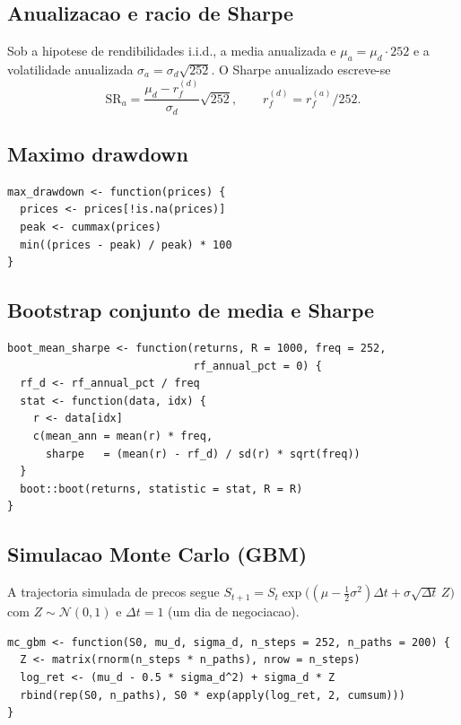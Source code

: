 \documentclass[11pt,a4paper]{article}
\begin{document}
\subsection{Anualizacao e racio de Sharpe}

Sob a hipotese de rendibilidades i.i.d., a media anualizada e
$\mu_a = \mu_d \cdot 252$ e a volatilidade anualizada
$\sigma_a = \sigma_d \sqrt{252}$. O Sharpe anualizado escreve-se
\[
  \mathrm{SR}_a = \frac{\mu_d - r_f^{(d)}}{\sigma_d}\sqrt{252},
  \qquad r_f^{(d)} = r_f^{(a)}/252.
\]

\subsection{Maximo drawdown}
\begin{lstlisting}[caption={Maximo drawdown a partir de uma serie de precos.}]
max_drawdown <- function(prices) {
  prices <- prices[!is.na(prices)]
  peak <- cummax(prices)
  min((prices - peak) / peak) * 100
}
\end{lstlisting}

\subsection{Bootstrap conjunto de media e Sharpe}
\begin{lstlisting}[caption={Bootstrap nao parametrico.}]
boot_mean_sharpe <- function(returns, R = 1000, freq = 252,
                             rf_annual_pct = 0) {
  rf_d <- rf_annual_pct / freq
  stat <- function(data, idx) {
    r <- data[idx]
    c(mean_ann = mean(r) * freq,
      sharpe   = (mean(r) - rf_d) / sd(r) * sqrt(freq))
  }
  boot::boot(returns, statistic = stat, R = R)
}
\end{lstlisting}

\subsection{Simulacao Monte Carlo (GBM)}

A trajectoria simulada de precos segue
$S_{t+1} = S_t \exp\!\big((\mu - \tfrac{1}{2}\sigma^2)\Delta t +
\sigma\sqrt{\Delta t}\,Z\big)$ com $Z \sim \mathcal{N}(0,1)$ e
$\Delta t = 1$ (um dia de negociacao).

\begin{lstlisting}[caption={GBM vectorizado.}]
mc_gbm <- function(S0, mu_d, sigma_d, n_steps = 252, n_paths = 200) {
  Z <- matrix(rnorm(n_steps * n_paths), nrow = n_steps)
  log_ret <- (mu_d - 0.5 * sigma_d^2) + sigma_d * Z
  rbind(rep(S0, n_paths), S0 * exp(apply(log_ret, 2, cumsum)))
}
\end{lstlisting}
\end{document}
